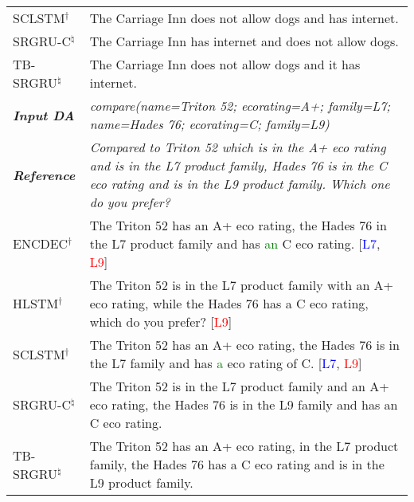 \documentclass{llncs}
\begin{document}
\begin{table}[ht]
{\begin{tabularx}{1.24\textwidth}{lX}
SCLSTM\textbf{$^{\dag}$} & The Carriage Inn does not allow dogs and has internet. \\
SRGRU-C\textbf{$^{\natural}$} & The Carriage Inn has internet and does not allow dogs.\\
TB-SRGRU\textbf{$^{\natural}$} & The Carriage Inn does not allow dogs and it has internet. \\ \hline
\textbf{\textit{Input DA}} & \textit{compare(name=Triton 52; ecorating=A+; family=L7; name=Hades 76; ecorating=C; family=L9)}
 \\
 \textbf{\textit{Reference}} & \textit{Compared to Triton 52 which is in the A+ eco rating and is in the L7 product family, Hades 76 is in the C eco rating and is in the L9 product family. Which one do you prefer?}
 \\
ENCDEC\textbf{$^{\dag}$} & The Triton 52 has an A+ eco rating, the Hades 76 in the L7 product family and has \textcolor{green}{an} C eco rating. [\textcolor{blue}{L7}, \textcolor{red}{L9}] \\
HLSTM\textbf{$^{\dag}$} & The Triton 52 is in the L7 product family with an A+ eco rating, while the Hades 76 has a C eco rating, which do you prefer? [\textcolor{red}{L9}] \\
SCLSTM\textbf{$^{\dag}$} & The Triton 52 has an A+ eco rating, the Hades 76 is in the L7 family and has \textcolor{green}{a} eco rating of C. [\textcolor{blue}{L7}, \textcolor{red}{L9}]\\
SRGRU-C\textbf{$^{\natural}$} & The Triton 52 is in the L7 product family and an A+ eco rating, the Hades 76 is in the L9 family and has an C eco rating.\\
TB-SRGRU\textbf{$^{\natural}$} & The Triton 52 has an A+ eco rating, in the L7 product family, the Hades 76 has a C eco rating and is in the L9 product family.
\end{tabularx}%
}
\end{table}
\end{document}
